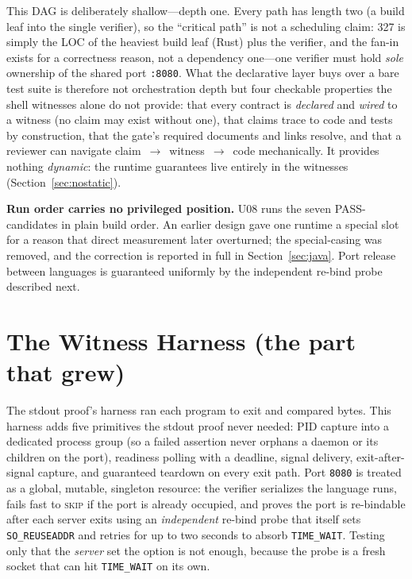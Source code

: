 \documentclass[11pt,letterpaper]{article}
\begin{document}
This DAG is deliberately shallow---depth one. Every path has length two (a
build leaf into the single verifier), so the ``critical path'' is not a
scheduling claim: 327 is simply the LOC of the heaviest build leaf (Rust)
plus the verifier, and the fan-in exists for a correctness reason, not a
dependency one---one verifier must hold \emph{sole} ownership of the shared
port \texttt{:8080}. What the declarative layer buys over a bare test suite is
therefore not orchestration depth but four checkable properties the shell
witnesses alone do not provide: that every contract is \emph{declared} and
\emph{wired} to a witness (no claim may exist without one), that claims trace
to code and tests by construction, that the gate's required documents and
links resolve, and that a reviewer can navigate claim~$\to$~witness~$\to$~code
mechanically. It provides nothing \emph{dynamic}: the runtime guarantees live
entirely in the witnesses (Section~\ref{sec:nostatic}).

\textbf{Run order carries no privileged position.} U08 runs the seven
PASS-candidates in plain build order. An earlier design gave one runtime a
special slot for a reason that direct measurement later overturned; the
special-casing was removed, and the correction is reported in full in
Section~\ref{sec:java}. Port release between languages is guaranteed
uniformly by the independent re-bind probe described next.

\section{The Witness Harness (the part that grew)}

The stdout proof's harness ran each program to exit and compared bytes.
This harness adds five primitives the stdout proof never needed: PID
capture into a dedicated process group (so a failed assertion never
orphans a daemon or its children on the port), readiness polling with a
deadline, signal delivery, exit-after-signal capture, and guaranteed
teardown on every exit path. Port \texttt{8080} is treated as a global,
mutable, singleton resource: the verifier serializes the language runs,
fails fast to \textsc{skip} if the port is already occupied, and proves
the port is re-bindable after each server exits using an
\emph{independent} re-bind probe that itself sets \texttt{SO\_REUSEADDR}
and retries for up to two seconds to absorb \texttt{TIME\_WAIT}. Testing
only that the \emph{server} set the option is not enough, because the
probe is a fresh socket that can hit \texttt{TIME\_WAIT} on its own.
\end{document}
